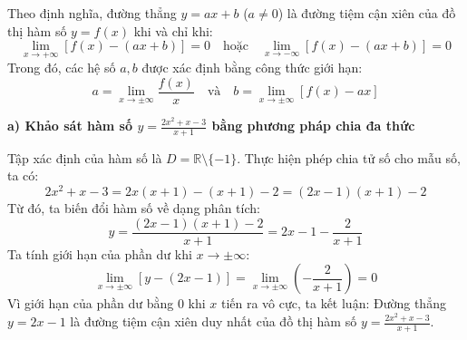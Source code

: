 \documentclass[12pt]{article}
\begin{document}
	\begin{loigiai}
		Theo định nghĩa, đường thẳng $y = ax + b$ ($a \ne 0$) là đường tiệm cận xiên của đồ thị hàm số $y = f(x)$ khi và chỉ khi:
		\[ \lim_{x \to +\infty} [f(x) - (ax + b)] = 0 \quad \text{hoặc} \quad \lim_{x \to -\infty} [f(x) - (ax + b)] = 0 \]
		Trong đó, các hệ số $a, b$ được xác định bằng công thức giới hạn:
		\[ a = \lim_{x \to \pm\infty} \frac{f(x)}{x} \quad \text{và} \quad b = \lim_{x \to \pm\infty} [f(x) - ax] \]
		
		\textbf{a) Khảo sát hàm số $y = \frac{2x^2 + x - 3}{x + 1}$ bằng phương pháp chia đa thức}
		
		Tập xác định của hàm số là $D = \mathbb{R} \setminus \{-1\}$. Thực hiện phép chia tử số cho mẫu số, ta có:
		\[ 2x^2 + x - 3 = 2x(x + 1) - (x + 1) - 2 = (2x - 1)(x + 1) - 2 \]
		Từ đó, ta biến đổi hàm số về dạng phân tích:
		\[ y = \frac{(2x - 1)(x + 1) - 2}{x + 1} = 2x - 1 - \frac{2}{x + 1} \]
		Ta tính giới hạn của phần dư khi $x \to \pm\infty$:
		\[ \lim_{x \to \pm\infty} [y - (2x - 1)] = \lim_{x \to \pm\infty} \left( -\frac{2}{x + 1} \right) = 0 \]
		Vì giới hạn của phần dư bằng $0$ khi $x$ tiến ra vô cực, ta kết luận: Đường thẳng $y = 2x - 1$ là đường tiệm cận xiên duy nhất của đồ thị hàm số $y = \frac{2x^2 + x - 3}{x + 1}$.
		
		\begin{figure}[H]
			\centering
\end{figure}
\end{loigiai}
\end{document}
